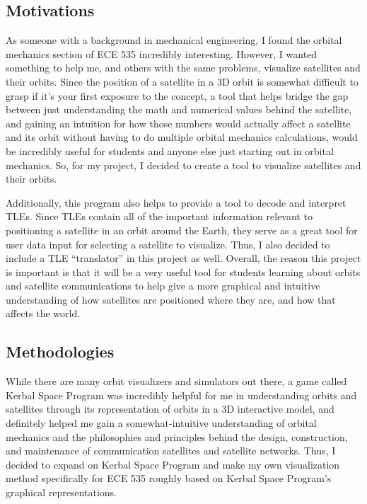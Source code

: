 \documentclass[conference]{IEEEtran}
\begin{document}
		\subsection{Motivations}
			As someone with a background in mechanical engineering, I found the orbital mechanics section of ECE 535 incredibly interesting. However, I wanted something to help me, and others with the same problems, visualize satellites and their orbits. Since the position of a satellite in a 3D orbit is somewhat difficult to grasp if it's your first exposure to the concept, a tool that helps bridge the gap between just understanding the math and numerical values behind the satellite, and gaining an intuition for how those numbers would actually affect a satellite and its orbit without having to do multiple orbital mechanics calculations, would be incredibly useful for students and anyone else just starting out in orbital mechanics. So, for my project, I decided to create a tool to visualize satellites and their orbits.
			
			Additionally, this program also helps to provide a tool to decode and interpret TLEs. Since TLEs contain all of the important information relevant to positioning a satellite in an orbit around the Earth, they serve as a great tool for user data input for selecting a satellite to visualize. Thus, I also decided to include a TLE ``translator'' in this project as well. Overall, the reason this project is important is that it will be a very useful tool for students learning about orbits and satellite communications to help give a more graphical and intuitive understanding of how satellites are positioned where they are, and how that affects the world.

		\subsection{Methodologies}
			While there are many orbit visualizers and simulators out there, a game called Kerbal Space Program was incredibly helpful for me in understanding orbits and satellites through its representation of orbits in a 3D interactive model, and definitely helped me gain a somewhat-intuitive understanding of orbital mechanics and the philosophies and principles behind the design, construction, and maintenance of communication satellites and satellite networks. Thus, I decided to expand on Kerbal Space Program and make my own visualization method specifically for ECE 535 roughly based on Kerbal Space Program's graphical representations.
\end{document}
